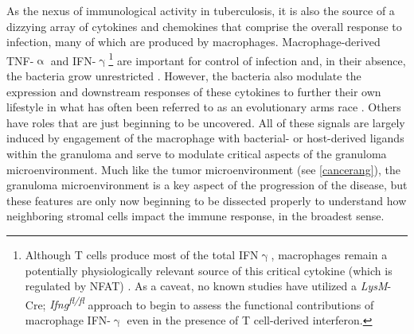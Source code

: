 As the nexus of immunological activity in tuberculosis, it is also the source of a dizzying array of cytokines and chemokines that comprise the overall response to infection, many of which are produced by macrophages. Macrophage\hyp{}derived TNF\hyp{}$\upalpha$ and IFN\hyp{}$\upgamma$\footnote{Although T cells produce most of the total IFN$\upgamma$, macrophages remain a potentially physiologically relevant source of this critical cytokine (which is regulated by NFAT) \citep{Darwich2009, Robinson2010}. As a caveat, no known studies have utilized a \textit{LysM}-Cre; \textit{Ifng\textsuperscript{fl/fl}} approach to begin to assess the functional contributions of macrophage IFN-$\upgamma$ even in the presence of T cell-derived interferon.} are important for control of infection and, in their absence, the bacteria grow unrestricted \citep{Fenton1997, Flynn1993, Flynn1995, Algood2005}. However, the bacteria also modulate the expression and downstream responses of these cytokines to further their own lifestyle in what has often been referred to as an evolutionary arms race \citep{Ting1999}. Others have roles that are just beginning to be uncovered. All of these signals are largely induced by engagement of the macrophage with bacterial\hyp{} or host\hyp{}derived ligands within the granuloma and serve to modulate critical aspects of the granuloma microenvironment. Much like the tumor microenvironment (see \autoref{cancerang}), the granuloma microenvironment is a key aspect of the progression of the disease, but these features are only now beginning to be dissected properly to understand how neighboring stromal cells impact the immune response, in the broadest sense. 

